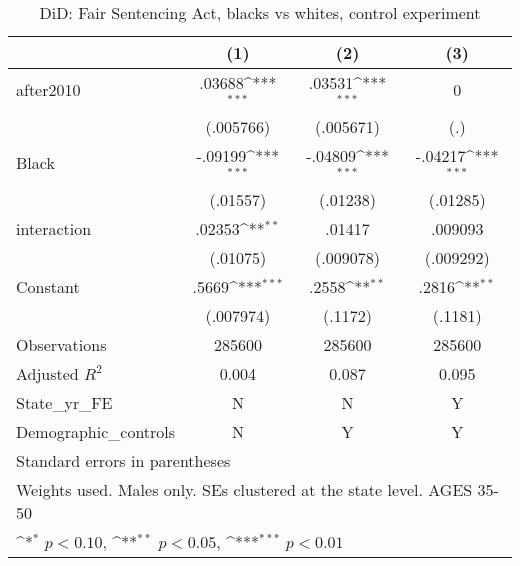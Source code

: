 \begin{table}[htbp]\centering
\def\sym#1{\ifmmode^{#1}\else\(^{#1}\)\fi}
\caption{DiD: Fair Sentencing Act, blacks vs whites, control experiment}
\begin{tabular}{l*{3}{c}}
\hline\hline
                    &\multicolumn{1}{c}{(1)}         &\multicolumn{1}{c}{(2)}         &\multicolumn{1}{c}{(3)}         \\
\hline
after2010           &      .03688\sym{***}&      .03531\sym{***}&           0         \\
                    &   (.005766)         &   (.005671)         &         (.)         \\
[1em]
Black               &     -.09199\sym{***}&     -.04809\sym{***}&     -.04217\sym{***}\\
                    &    (.01557)         &    (.01238)         &    (.01285)         \\
[1em]
interaction         &      .02353\sym{**} &      .01417         &     .009093         \\
                    &    (.01075)         &   (.009078)         &   (.009292)         \\
[1em]
Constant            &       .5669\sym{***}&       .2558\sym{**} &       .2816\sym{**} \\
                    &   (.007974)         &     (.1172)         &     (.1181)         \\
\hline
Observations        &      285600         &      285600         &      285600         \\
Adjusted \(R^{2}\)  &       0.004         &       0.087         &       0.095         \\
State\_yr\_FE         &           N         &           N         &           Y         \\
Demographic\_controls&           N         &           Y         &           Y         \\
\hline\hline
\multicolumn{4}{l}{\footnotesize Standard errors in parentheses}\\
\multicolumn{4}{l}{\footnotesize Weights used. Males only. SEs clustered at the state level. AGES 35-50}\\
\multicolumn{4}{l}{\footnotesize \sym{*} \(p<0.10\), \sym{**} \(p<0.05\), \sym{***} \(p<0.01\)}\\
\end{tabular}
\end{table}
